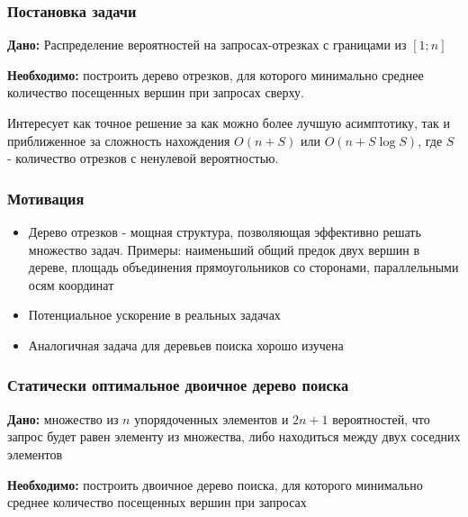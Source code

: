 \documentclass{beamer}
\begin{document}
\begin{frame}
\frametitle{Постановка задачи}

\textbf{Дано:} Распределение вероятностей на запросах-отрезках с границами из $[1; n]$

\textbf{Необходимо:} построить дерево отрезков, для которого минимально среднее количество посещенных вершин при запросах сверху.

Интересует как точное решение за как можно более лучшую асимптотику, так и приближенное за сложность нахождения $O(n + S)$ или $O(n + S \log S)$, где $S$ - количество отрезков с ненулевой вероятностью.

\end{frame}

\begin{frame}
\frametitle{Мотивация}

\begin{itemize}
\item Дерево отрезков - мощная структура, позволяющая эффективно решать множество задач. Примеры: наименьший общий предок двух вершин в дереве, площадь объединения прямоугольников со сторонами, параллельными осям координат
\item Потенциальное ускорение в реальных задачах
\item Аналогичная задача для деревьев поиска хорошо изучена

\end{itemize}

\end{frame}

\begin{frame}
\frametitle{Статически оптимальное двоичное дерево поиска}

\textbf{Дано:} множество из $n$ упорядоченных элементов и $2n + 1$ вероятностей, что запрос будет равен элементу из множества, либо находиться между двух соседних элементов

\textbf{Необходимо:} построить двоичное дерево поиска, для которого минимально среднее количество посещенных вершин при запросах

\end{frame}
\end{document}
